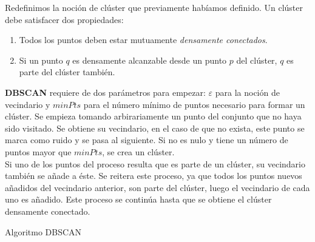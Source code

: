 \documentclass[a4paper, 12pt]{article}
\begin{document}
Redefinimos la noci\'on de cl\'uster que previamente hab\'iamos definido. Un cl\'uster debe satisfacer dos propiedades:\\

\begin{enumerate}
	\item Todos los puntos deben estar mutuamente \textit{densamente conectados}.
	\item Si un punto $q$ es densamente alcanzable desde un punto $p$ del cl\'uster, $q$ es parte del cl\'uster tambi\'en. 
\end{enumerate}

\textbf{DBSCAN} requiere de dos par\'ametros para empezar: $\varepsilon$ para la noci\'on de vecindario y $minPts$ para el n\'umero m\'inimo de puntos necesario para formar un cl\'uster. Se empieza tomando arbirariamente un punto del conjunto que no haya sido visitado. Se obtiene su vecindario, en el caso de que no exista, este punto se marca como ruido y se pasa al siguiente. Si no es nulo y tiene un n\'umero de puntos mayor que $minPts$, se crea un cl\'uster. \\

Si uno de los puntos del proceso resulta que es parte de un cl\'uster, su vecindario tambi\'en se a\~nade a \'este. Se reitera este proceso, ya que todos los puntos nuevos a\~nadidos del vecindario anterior, son parte del cl\'uster, luego el vecindario de cada uno es a\~nadido. Este proceso se contin\'ua hasta que se obtiene el cl\'uster densamente conectado. \\

\begin{algorithm}[!htbp]\label{DBSCAN}
\begin{algorithmic}[1]
		\Else
			\Else
			\EndIf
		
		\EndIf
	\EndFor
\EndFunction
\State{}
			\EndIf
		\EndIf
		\EndIf
	\EndFor
\EndFunction
\State{}
\EndFunction
\end{algorithmic}
\caption{\label{alg:DBSCAN} Algoritmo DBSCAN}
\end{algorithm}
\end{document}
